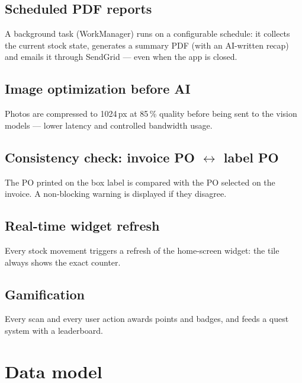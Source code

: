 \documentclass[11pt,a4paper]{article}
\begin{document}
\subsection{Scheduled PDF reports}
A background task (WorkManager) runs on a configurable schedule: it
collects the current stock state, generates a summary PDF (with an
AI-written recap) and emails it through SendGrid — even when the app
is closed.

\subsection{Image optimization before AI}
Photos are compressed to 1024\,px at 85\,\% quality before being
sent to the vision models — lower latency and controlled bandwidth
usage.

\subsection{Consistency check: invoice PO $\leftrightarrow$ label PO}
The PO printed on the box label is compared with the PO selected on
the invoice. A non-blocking warning is displayed if they disagree.

\subsection{Real-time widget refresh}
Every stock movement triggers a refresh of the home-screen widget:
the tile always shows the exact counter.

\subsection{Gamification}
Every scan and every user action awards points and badges, and feeds
a quest system with a leaderboard.

\section{Data model}
\end{document}
